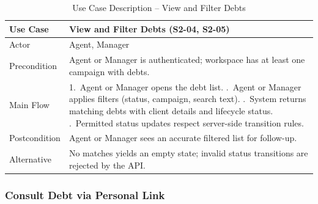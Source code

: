 \documentclass[12pt,a4paper]{report}
\newcommand{\reporttablesetup}{%
  \small%
  \setlength{\tabcolsep}{5pt}%
  \renewcommand{\arraystretch}{1.22}%
  \arrayrulecolor{framegray}%
}
\begin{document}
\begin{table}[H]
  \centering
  \reporttablesetup
  \begin{tabularx}{\textwidth}{|p{3.1cm}|Y|}
    \hline
    Use Case     & View and Filter Debts (S2-04, S2-05) \\
    \hline
    Actor        & Agent, Manager \\
    \hline
    Precondition & Agent or Manager is authenticated; workspace has at least one
                   campaign with debts. \\
    \hline
    Main Flow    & 1.\ Agent or Manager opens the debt list. .\ Agent or Manager applies filters (status, campaign, search
                       text). .\ System returns matching debts with client details and lifecycle
                       status. .\ Permitted status updates respect server-side transition rules.
    \\
    \hline
    Postcondition & Agent or Manager sees an accurate filtered list for follow-up. \\
    \hline
    Alternative  & No matches yields an empty state; invalid status transitions are
                   rejected by the API. \\
    \hline
  \end{tabularx}
  \caption{Use Case Description -- View and Filter Debts}
  \label{tab:uc-s2-04}
\end{table}

\subsubsection{Consult Debt via Personal Link}
\end{document}
